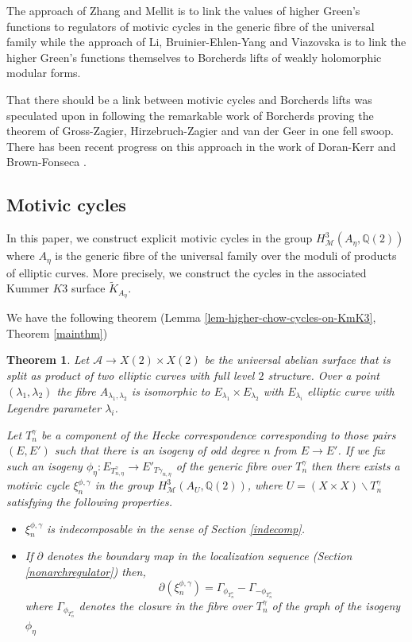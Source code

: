 \documentclass[11pt,a4paper]{article}
\newtheorem{thm}[defn]{Theorem}
\newcommand {\A}{{\mathcal A}}
\newcommand {\Q}{{\mathds Q}}
\newcommand {\M}{{\mathcal M}}
\newcommand {\TK}{{\tilde{K}}}
\newcommand {\lb}{{\lambda}}
\begin{document}
The approach of Zhang and Mellit is to link the values of higher Green's functions to regulators of motivic cycles in the generic fibre of the universal family while the approach of Li, Bruinier-Ehlen-Yang and Viazovska is to link the higher Green's functions themselves to Borcherds lifts of weakly holomorphic modular forms. 

That there should be a link between motivic cycles and Borcherds lifts was speculated upon in \cite{sree2000} following the remarkable work of Borcherds \cite{borc} proving the theorem of Gross-Zagier, Hirzebruch-Zagier and van der Geer in one fell swoop. There has been recent progress on this approach in the work of Doran-Kerr \cite{doke} and Brown-Fonseca \cite{brfo}. 

\subsection{Motivic cycles}

In this paper, we construct explicit motivic cycles in the group $H^3_{\M}(A_{\eta},\Q(2))$ where $A_{\eta}$ is the generic fibre of the universal family over the moduli of products of elliptic curves. More precisely, we construct the cycles in the associated Kummer $K3$ surface $\TK_{A_{\eta}}$. 

We have the following theorem (Lemma \ref{lem-higher-chow-cycles-on-KmK3}, Theorem \ref{mainthm})

\begin{thm} 
	
	Let $\A \to X(2) \times X(2)$ be the universal abelian surface that is split as product of two elliptic curves with full level $2$ structure. Over a point $(\lb_1,\lb_2)$ the fibre $A_{\lb_1,\lb_2}$ is isomorphic to $E_{\lb_1}\times E_{\lb_2}$ with $E_{\lambda_i}$ elliptic curve with Legendre parameter $\lambda_i$.
		
	 Let $T_n^{\gamma}$ be a component of the Hecke correspondence corresponding to those pairs $(E,E')$ such that there is an isogeny  of odd degree $n$ from $E \rightarrow E'$.  If we fix such an isogeny $\phi_{\eta}:E_{T^{\gamma}_{n,\eta}} \rightarrow E'_{T{\gamma}_{n,\eta}}$ of the generic fibre over $T^{\gamma}_n$ then there exists a motivic cycle $\xi_n^{\phi,\gamma}$  in the group $H^3_{\M}(A_U,\Q(2))$, where $U=(X \times X )\backslash T_n^{\gamma}$ satisfying the following properties.
	 
	 \begin{itemize}
	 	\item $\xi_n^{\phi,\gamma}$ is indecomposable in the sense of Section \ref{indecomp}.
	
	\item  If $\partial$ denotes the boundary map in the localization sequence (Section \ref{nonarchregulator}) then, 
	$$\partial(\xi_{n}^{\phi,\gamma})=\Gamma_{\phi_{T^{\gamma}_n}}-\Gamma_{-\phi_{T_n^{\gamma}}}$$
	where $\Gamma_{\phi_{T_n^{\gamma}}}$ denotes the closure in the fibre over $T_{n}^{\gamma}$ of the graph of the isogeny $\phi_{\eta}$
	
	\end{itemize}

	\end{thm} 
\end{document}
